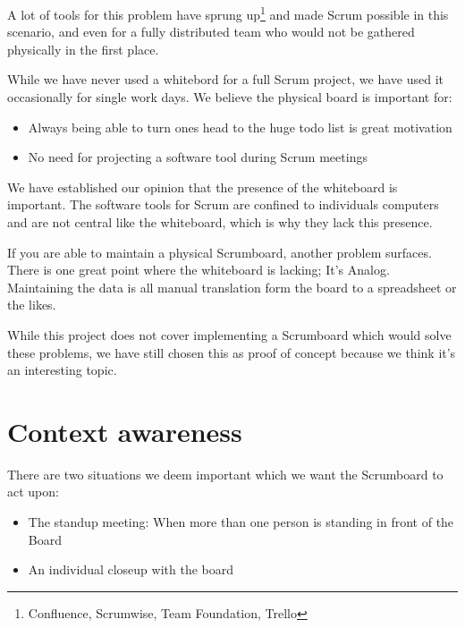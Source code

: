 \documentclass[]{report}
\begin{document}
A lot of tools for this problem have sprung up\footnote{Confluence, Scrumwise, Team Foundation, Trello} and made Scrum possible in this scenario, and even for a fully distributed team who would not be gathered physically in the first place.

While we have never used a whitebord for a full Scrum project, we have used it occasionally for single work days. We believe the physical board is important for:

\begin{itemize}
\item Always being able to turn ones head to the huge todo list is great motivation
\item No need for projecting a software tool during Scrum meetings
\end{itemize}


We have established our opinion that the presence of the whiteboard is important. The software tools for Scrum are confined to individuals computers and are not central like the whiteboard, which is why they lack this presence.

If you are able to maintain a physical Scrumboard, another problem surfaces. There is one great point where the whiteboard is lacking; It's Analog. Maintaining the data is all manual translation form the board to a spreadsheet or the likes.



While this project does not cover implementing a Scrumboard which would solve these problems, we have still chosen this as proof of concept because we think it's an interesting topic.


\section{Context awareness}

There are two situations we deem important which we want the Scrumboard to act upon:

\begin{itemize}
\item The standup meeting: When more than one person is standing in front of the Board
\item An individual closeup with the board
\end{itemize}
\end{document}
